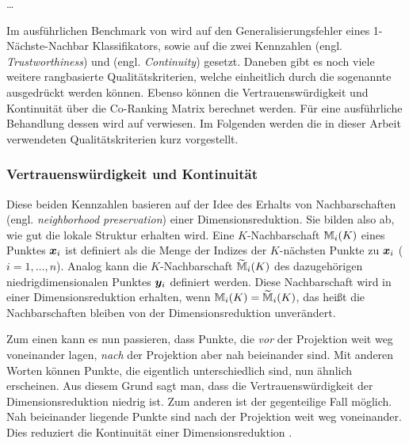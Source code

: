 \ldots
{}

Im ausführlichen Benchmark von \textcite{vanderMaaten.2009} wird auf den Generalisierungsfehler
eines 1-Nächste-Nachbar Klassifikators, sowie auf die zwei Kennzahlen
 (engl. \textit{Trustworthiness}) und  (engl.
\textit{Continuity}) \parencites{Venna.2001}{Venna.2006} gesetzt. Daneben gibt es noch viele weitere rangbasierte
Qualitätskriterien, welche einheitlich durch die sogenannte  ausgedrückt
werden können. Ebenso können die Vertrauenswürdigkeit und Kontinuität über die Co-Ranking Matrix
berechnet werden. Für eine ausführliche Behandlung dessen wird auf \textcite{Lee.2009} verwiesen.
Im Folgenden werden die in dieser Arbeit verwendeten Qualitätskriterien kurz vorgestellt.

\subsubsection{Vertrauenswürdigkeit und Kontinuität}
Diese beiden Kennzahlen basieren auf der Idee des Erhalts von Nachbarschaften (engl.
\textit{neighborhood preservation}) einer Dimensionsreduktion. Sie bilden also ab, wie gut die
lokale Struktur erhalten wird. Eine $K$-Nachbarschaft $\mathbb{M}_i(K)$ eines Punktes $\bm{x}_i$ ist
definiert als die Menge der Indizes der $K$-nächsten Punkte zu $\bm{x}_i$ ($i = 1, \ldots, n$).
Analog kann die $K$-Nachbarschaft $\widetilde{\mathbb{M}}_i(K)$ des dazugehörigen niedrigdimensionalen
Punktes $\bm{y}_i$ definiert werden. Diese Nachbarschaft wird in einer Dimensionsreduktion
erhalten, wenn $\mathbb{M}_i(K) = \widetilde{\mathbb{M}}_i(K)$, das heißt die Nachbarschaften bleiben von
der Dimensionsreduktion unverändert.

Zum einen kann es nun passieren, dass Punkte, die \textit{vor} der Projektion weit weg voneinander
lagen, \textit{nach} der Projektion aber nah beieinander sind. Mit anderen Worten können Punkte,
die eigentlich unterschiedlich sind, nun ähnlich erscheinen. Aus diesem Grund sagt man, dass die
Vertrauenswürdigkeit der Dimensionsreduktion niedrig ist. Zum anderen ist der gegenteilige Fall
möglich. Nah beieinander liegende Punkte sind nach der Projektion weit weg voneinander. Dies
reduziert die Kontinuität einer Dimensionsreduktion \parencite[486 -- 487]{Venna.2001}.

